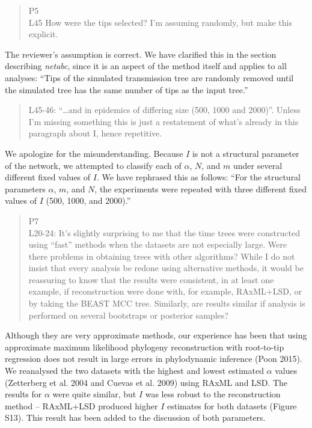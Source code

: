 \documentclass[12pt]{letter}
\begin{document}
\begin{letter}{ }
\begin{quote}
  \itshape

  P5 \\
  L45 How were the tips selected? I'm assuming randomly, but make this explicit.
\end{quote}

The reviewer's assumption is correct. We have clarified this in the section
describing \textit{netabc}, since it is an aspect of the method itself and
applies to all analyses: ``Tips of the simulated transmission tree are randomly
removed until the simulated tree has the same number of tips as the input
tree.''

\begin{quote}
  \itshape

  L45-46: ``\ldots and in epidemics of differing size (500, 1000 and 2000)''.
  Unless I'm missing something this is just a restatement of what's already in
  this paragraph about I, hence repetitive. 
\end{quote}

We apologize for the misunderstanding. Because $I$ is not a structural
parameter of the network, we attempted to classify each of $\alpha$, $N$, and
$m$ under several different fixed values of $I$. We have rephrased this as
follows: ``For the structural parameters $\alpha$, $m$, and $N$, the
experiments were repeated with three different fixed values of $I$ (500, 1000,
and 2000).''

\begin{quote}
  \itshape

  P7 \\
  L20-24: It's slightly surprising to me that the time trees were constructed
  using ``fast'' methods when the datasets are not especially large. Were there
  problems in obtaining trees with other algorithms? While I do not insist that
  every analysis be redone using alternative methods, it would be reassuring to
  know that the results were consistent, in at least one example, if
  reconstruction were done with, for example, RAxML+LSD, or by taking the BEAST
  MCC tree. Similarly, are results similar if analysis is performed on several
  bootstraps or posterior samples?
\end{quote}

Although they are very approximate methods, our experience has been that using
approximate maximum likelihood phylogeny reconstruction with root-to-tip
regression does not result in large errors in phylodynamic inference (Poon
2015). We reanalysed the two datasets with the highest and lowest estimated
$\alpha$ values (Zetterberg et al. 2004 and Cuevas et al. 2009) using RAxML and
LSD. The results for $\alpha$ were quite similar, but $I$ was less robust to
the reconstruction method -- RAxML+LSD produced higher $I$ estimates for both
datasets (Figure S13). This result has been added to the discussion of both
parameters.


\end{letter}
\end{document}
